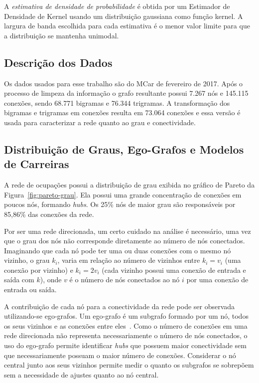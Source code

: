 \documentclass[12pt,a4paper]{article}
\begin{document}
A \textit{estimativa de densidade de probabilidade} é obtida por um Estimador de Densidade de Kernel usando um distribuição gaussiana como função kernel. A largura de banda escolhida para cada estimativa é o menor valor limite para que a distribuição se mantenha unimodal.


\subsection{Descrição dos Dados}  \label{sec:descricao-dos-dados}

Os dados usados para esse trabalho são do MCar de fevereiro de 2017. Após o processo de limpeza da informação o grafo resultante possui 7.267 nós e 145.115 conexões, sendo 68.771 bigramas e 76.344 trigramas. A transformação dos bigramas e trigramas em conexões resulta em 73.064 conexões e essa versão é usada para caracterizar a rede quanto ao grau e conectividade.


\subsection{Distribuição de Graus, Ego-Grafos e Modelos de Carreiras}  \label{sec:distribuicao-de-graus}

A rede de ocupações possui a distribuição de grau exibida no gráfico de Pareto da Figura~\ref{fig:pareto-grau}. Ela possui uma grande concentração de conexões em poucos nós, formando \textit{hubs}. Os 25\% nós de maior grau são responsáveis por 85,86\% das conexões da rede.

Por ser uma rede direcionada, um certo cuidado na análise é necessário, uma vez que o grau dos nós não corresponde diretamente ao número de nós conectados. Imaginando que cada nó pode ter uma ou duas conexões com o mesmo nó vizinho, o grau $k_i$, varia em relação ao número de vizinhos entre $k_i = v_i$ (uma conexão por vizinho) e $k_i = 2v_i$ (cada vizinho possui uma conexão de entrada e saída com $k$), onde $v$ é o número de nós conectados ao nó $i$ por uma conexão de entrada ou saída.

A contribuição de cada nó para a conectividade da rede pode ser observada utilizando-se ego-grafos. Um ego-grafo é um subgrafo formado por um nó, todos os seus vizinhos e as conexões entre eles~\cite{Newman2010-od}. Como o número de conexões em uma rede direcionada não representa necessariamente o número de nós conectados, o uso do ego-grafo permite identificar \textit{hubs} que possuem maior conectividade sem que necessariamente possuam o maior número de conexões. Considerar o nó central junto aos seus vizinhos permite medir o quanto os subgrafos se sobrepõem sem a necessidade de ajustes quanto ao nó central.
\end{document}
